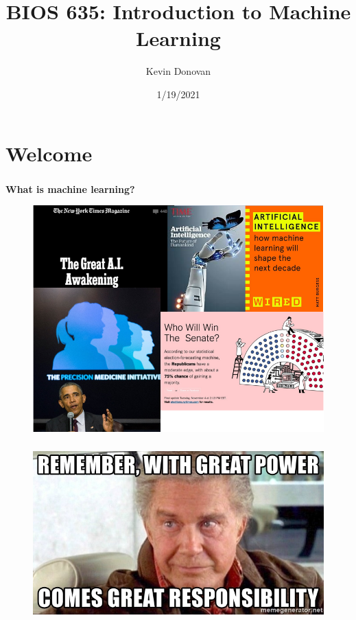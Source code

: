 \documentclass[xcolor=dvipsnames]{beamer}
\title[Lecture 1]{BIOS 635: Introduction to Machine Learning}
\author[Kevin Donovan]{Kevin Donovan}
\institute[UNC BIOS]{UNC-Chapel Hill}
\date[1/19/2021]{1/19/2021}
\begin{document}
\begin{frame}
	\titlepage
\end{frame}

\section{Welcome}
\begin{frame}
\frametitle{\insertsectionhead}
\textbf{What is machine learning?}\\
\begin{figure}
\includegraphics[scale=0.5]{images/ml_collage.png}
\end{figure}
\end{frame}

\begin{frame}
\frametitle{\insertsectionhead}
\begin{figure}
\includegraphics[scale=0.5]{images/great_power_great_resp.jpg}
\end{figure}
\end{frame}
\end{document}
